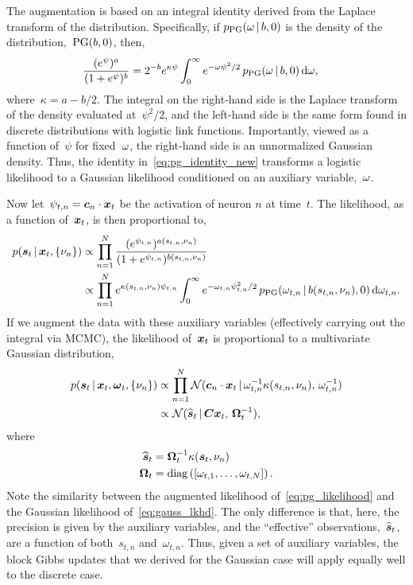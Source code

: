 The augmentation is based on an integral identity
derived from the Laplace transform of the \polyagamma distribution.
Specifically, if $p_{\mathrm{PG}}({\omega}\,|\, b, 0)$ is the
density of the \polyagamma distribution,~${\mathrm{PG}(b, 0)}$,
then,
\begin{align}
  \frac{(e^{\psi})^a}{(1+e^{\psi})^b}
  &= 2^{-b} e^{\kappa \psi}
  \int_{0}^{\infty} e^{-{\omega} \psi^2 /2} \,
  p_{\mathrm{PG}}({\omega} \,|\, b, 0) \, \mathrm{d}{\omega},
\label{eq:pg_identity_new}
\end{align}
where~${\kappa=a-b/2}$. The integral on the right-hand side is the
Laplace transform of the \polyagamma density evaluated at~$\psi^2/2$,
and the left-hand side is the same form found in discrete
distributions with logistic link functions.  Importantly, viewed as a
function of~$\psi$ for fixed~${\omega}$, the right-hand side is an
unnormalized Gaussian density.  Thus, the identity
in~\eqref{eq:pg_identity_new} transforms a logistic likelihood to a
Gaussian likelihood conditioned on an auxiliary variable,~${\omega}$.

Now let~$\psi_{t,n} = \boldsymbol{c}_n \cdot \boldsymbol{x}_t$ be the activation of neuron
$n$ at time~$t$. The likelihood, as a function of~$\boldsymbol{x}_t$, is then
proportional to,
\begin{align*}
  p(\boldsymbol{s}_t \,|\, \boldsymbol{x}_t, \{\nu_n\})
  &\propto \prod_{n=1}^N 
  \frac{(e^{\psi_{t,n}})^{a(s_{t,n}, \nu_n)}}
       {(1+e^{\psi_{t,n}})^{b(s_{t,n}, \nu_n)}} \\
  &\propto \prod_{n=1}^N 
     e^{\kappa(s_{t,n}, \nu_n) \psi_{t,n}}
  \int_{0}^{\infty} e^{-{\omega}_{t,n} \psi_{t,n}^2 /2} \,
  p_{\mathrm{PG}}({\omega}_{t,n} \,|\, b(s_{t,n}, \nu_n), 0) \,
  \mathrm{d}{\omega}_{t,n}.
\end{align*}
If we augment the data with these auxiliary variables (effectively 
carrying out the integral via MCMC),  the likelihood
of~$\boldsymbol{x}_t$ is proportional to a multivariate Gaussian distribution,
\begin{align}
  \nonumber
  p(\boldsymbol{s}_t \,|\, \boldsymbol{x}_t, \boldsymbol{\omega}_t, \{\nu_n\})
  &\propto \prod_{n=1}^N
  \mathcal{N}(\boldsymbol{c}_n \cdot \boldsymbol{x}_t \,|\,
  \omega_{t,n}^{-1} \kappa(s_{t,n}, \nu_n), \,
  \omega_{t,n}^{-1}) \\
  \label{eq:pg_likelihood}
  &\propto \mathcal{N}(
  \widehat{\boldsymbol{s}}_t \,|\,
  \boldsymbol{C} \boldsymbol{x}_t, \, 
  \boldsymbol{\Omega}_t^{-1}),
\end{align}
where
\begin{align*}
  \widehat{\boldsymbol{s}}_t &= \boldsymbol{\Omega}_t^{-1} \kappa(\boldsymbol{s}_t, \nu_n) \\
  \boldsymbol{\Omega}_t &= \mathrm{diag} \left( \left[ \omega_{t,1}, \ldots, \omega_{t,N} \right] \right).
\end{align*}
Note the similarity between the augmented likelihood
of~\eqref{eq:pg_likelihood} and the Gaussian likelihood
of~\eqref{eq:gauss_lkhd}. The only difference is that, here, the
precision is given by the auxiliary variables, and the ``effective''
observations,~$\widehat{\boldsymbol{s}}_t$, are a function of both~$s_{t,n}$
and~$\omega_{t,n}$.  Thus, given a set of \polyagamma auxiliary
variables, the block Gibbs updates that we derived for the Gaussian
case will apply equally well to the discrete case.

